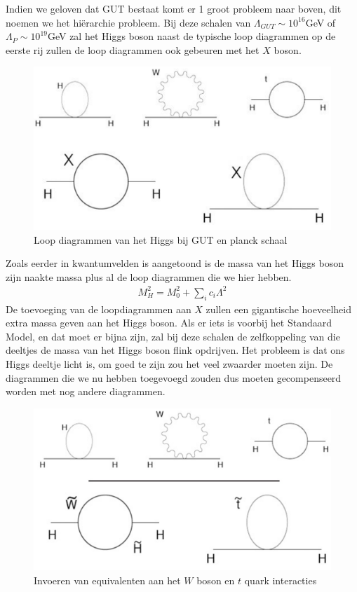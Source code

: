 \documentclass[../main.tex]{subfiles}
\begin{document}
Indien we geloven dat GUT bestaat komt er 1 groot probleem naar boven, dit noemen we het hiërarchie probleem. Bij deze schalen van $\Lambda_{G U T} \sim 10^{16}$GeV of $\Lambda_{P} \sim 10^{19}$GeV zal het Higgs boson naast de typische loop diagrammen op de eerste rij zullen de loop diagrammen ook gebeuren met het $X$ boson.

\begin{figure}[h]
    \centering
    \includegraphics[width=0.5\linewidth]{physics_beyond_the_standard_model/loop_diagrammen_higgs.png}
    \caption{Loop diagrammen van het Higgs bij GUT en planck schaal}%
    \label{fig:physics_beyond_the_standard_model/loop_diagrammen_higgs}
\end{figure}

Zoals eerder in kwantumvelden is aangetoond is de massa van het Higgs boson zijn naakte massa plus al de loop diagrammen die we hier hebben.
\begin{equation}
    \begin{aligned}
        \label{eq:massa_higgs}
        M_{H}^{2}=M_{0}^{2}+\sum_{i} c_{i} \Lambda^{2}
    \end{aligned}
\end{equation}
De toevoeging van de loopdiagrammen aan $X$ zullen een gigantische hoeveelheid extra massa geven aan het Higgs boson. Als er iets is voorbij het Standaard Model, en dat moet er bijna zijn, zal bij deze schalen de zelfkoppeling van die deeltjes de massa van het Higgs boson flink opdrijven. Het probleem is dat ons Higgs deeltje licht is, om goed te zijn zou het veel zwaarder moeten zijn. De diagrammen die we nu hebben toegevoegd zouden dus moeten gecompenseerd worden met nog andere diagrammen.

\begin{figure}[h]
    \centering
    \includegraphics[width=0.5\linewidth]{physics_beyond_the_standard_model/sussy_deeltjes.png}
    \caption{Invoeren van equivalenten aan het $W$ boson en $t$ quark interacties}%
    \label{fig:physics_beyond_the_standard_model/sussy_deeltjes}
\end{figure}
\end{document}
